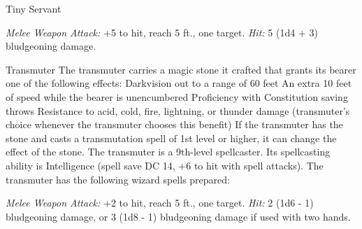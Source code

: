 \documentclass[10pt,a4paper,twoside,twocolumn,openany,bg=print,nodeprecatedcode]{dndbook}
\begin{document}
\begin{DndMonster}[float*=t]{Tiny Servant}
\DndMonsterBasics[
armor-class = {15 (natural armor)},
hit-points = {\DndDice{4d4}},
speed = {30 ft., 30 ft. (key)}
]
\DndMonsterAbilityScores[
 str = 4,
 dex = 16,
 con = 10,
 int = 2,
 wis = 10,
 cha = 1
]
\DndMonsterDetails[
damage-immunities = {poison, psychic},
senses = {blindsight 60 ft. (blind beyond this radius), passive perception 10},
]
\par
{}
\textsl{Melee Weapon Attack:} +5 to hit, reach 5 ft., one target. \textsl{Hit:} 5 (1d4 + 3) bludgeoning damage.
\end{DndMonster}


\clearpage

\begin{DndMonster}[float*=t]{Transmuter}
\DndMonsterBasics[
armor-class = {12 (15 with mage armor)},
hit-points = {\DndDice{9d8}},
speed = {30 ft.}
]
\DndMonsterAbilityScores[
 str = 9,
 dex = 14,
 con = 11,
 int = 17,
 wis = 12,
 cha = 11
]
\DndMonsterDetails[
saving-throws = {Int +6, Wis +4},
skills = {Arcana +6, History +6},
languages = {any four languages},
challenge = 5,
]
The transmuter carries a magic stone it crafted that grants its bearer one of the following effects:
Darkvision out to a range of 60 feet
An extra 10 feet of speed while the bearer is unencumbered
Proficiency with Constitution saving throws
Resistance to acid, cold, fire, lightning, or thunder damage (transmuter's choice whenever the transmuter chooses this benefit)
If the transmuter has the stone and casts a transmutation spell of 1st level or higher, it can change the effect of the stone.
The transmuter is a 9th-level spellcaster. Its spellcasting ability is Intelligence (spell save DC 14, +6 to hit with spell attacks). The transmuter has the following wizard spells prepared:
\begin{DndMonsterSpells}
\end{DndMonsterSpells}
\par
{}
\textsl{Melee Weapon Attack:} +2 to hit, reach 5 ft., one target. \textsl{Hit:} 2 (1d6 - 1) bludgeoning damage, or 3 (1d8 - 1) bludgeoning damage if used with two hands.
\end{DndMonster}
\end{document}
